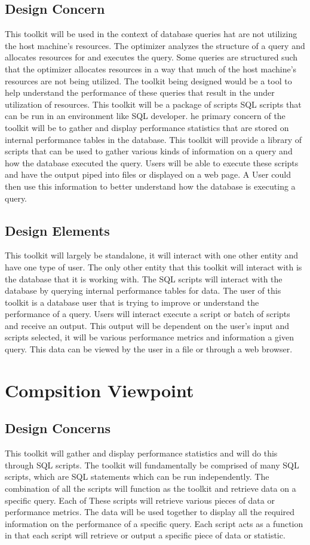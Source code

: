 \documentclass[draftclsnofoot, onecolumn, compsoc, 10pt]{IEEEtran}
\begin{document}
\subsection{Design Concern}
This toolkit will be used in the context of database queries hat are not utilizing the host machine's resources.
The optimizer analyzes the structure of a query and allocates resources for and executes the query.
Some queries are structured such that the optimizer allocates resources in a way that much of the host machine's resources are not being utilized.
The toolkit being designed would be a tool to help understand the performance of these queries that result in the under utilization of resources.
This toolkit will be a package of scripts SQL scripts that can be run in an environment like SQL developer.
he primary concern of the toolkit will be to gather and display performance statistics that are stored on internal performance tables in the database.
This toolkit will provide a library of scripts that can be used to gather various kinds of information on a query and how the database executed the query.
Users will be able to execute these scripts and have the output piped into files or displayed on a web page.
A User could then use this information to better understand how the database is executing a query.

\subsection{Design Elements}
This toolkit will largely be standalone, it will interact with one other entity and have one type of user.
The only other entity that this toolkit will interact with is the database that it is working with.
The SQL scripts will interact with the database by querying internal performance tables for data.
The user of this toolkit is a database user that is trying to improve or understand the performance of a query.
Users will interact execute a script or batch of scripts and receive an output.
This output will be dependent on the user's input and scripts selected,  it will be various performance metrics and information a given query. This data can be viewed by the user in a file or through a web browser. 

\section{Compsition Viewpoint}
\subsection{Design Concerns}
This toolkit will gather and display performance statistics and will do this through SQL scripts.
The toolkit will fundamentally be comprised of many SQL scripts, which are SQL statements which can be run independently.
The combination of all the scripts will function as the toolkit and retrieve data on a specific query.
Each of These scripts will retrieve various pieces of data or performance metrics.
The data  will be used together to display all the required information on the performance of a specific query.
Each script acts as a function in that each script will retrieve or output a specific piece of data or statistic.
\end{document}
